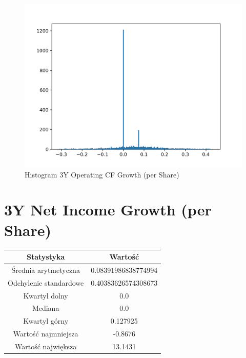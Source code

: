 \documentclass{article}
\begin{document}
\begin{figure}[h!]
    \includegraphics[width=\linewidth]{variables/3Y Operating CF Growth (per Share).png}
    \caption{Histogram 3Y Operating CF Growth (per Share) }
\end{figure}\section{ 3Y Net Income Growth (per Share) }

\begin{center}
    \begin{tabular}{|c | c|} 
    \hline
    Statystyka & Wartość \\
    \hline\hline
    Średnia arytmetyczna & 0.08391986838774994 \\ 
    \hline
    Odchylenie standardowe & 0.40383626574308673 \\
    \hline
    Kwartyl dolny & 0.0 \\
    \hline
    Mediana & 0.0 \\
    \hline
    Kwartyl górny & 0.127925 \\
    \hline
    Wartość najmniejsza & -0.8676 \\
    \hline
    Wartość największa & 13.1431 \\
    \hline
   \end{tabular}
\end{center}
\end{document}
